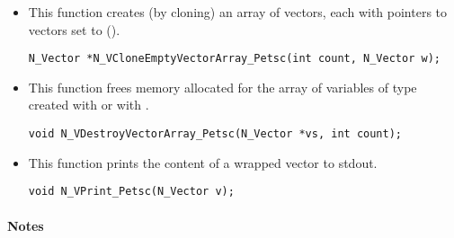 \begin{itemize}

\item {}
 
  This function creates (by cloning) an array of  {\nvecpetsc} vectors,
  each with pointers to {\petsc} vectors set to ().
 
\begin{verbatim}
N_Vector *N_VCloneEmptyVectorArray_Petsc(int count, N_Vector w);
\end{verbatim}


\item {}
 
 This function frees memory allocated for the array of  variables of
 type  created with  or with
 .
 

 \verb|void N_VDestroyVectorArray_Petsc(N_Vector *vs, int count);|



\item {}
  
  This function prints the content of a wrapped {\petsc} vector to stdout.
 
    
  \verb|void N_VPrint_Petsc(N_Vector v);|


\end{itemize}
\paragraph{\bf Notes} 
           
